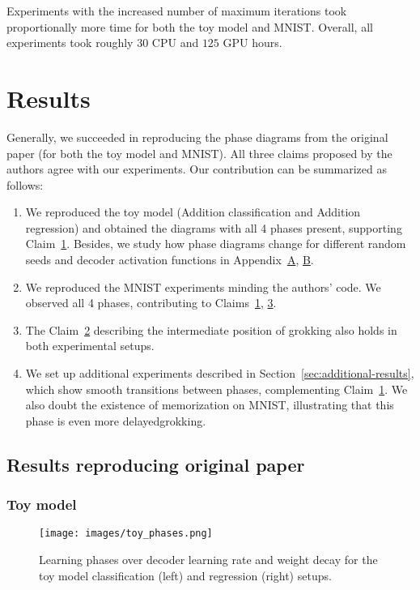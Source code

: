 Experiments with the increased number of maximum iterations took proportionally more time for both the toy model and MNIST. Overall, all experiments took roughly $30$ CPU and $125$ GPU hours.

\section{Results}
\label{sec:results}

Generally, we succeeded in reproducing the phase diagrams from the original paper (for both the toy model and MNIST). All three claims proposed by the authors agree with our experiments. Our contribution can be summarized as follows:
\begin{enumerate}
    \item We reproduced the toy model (Addition classification and Addition regression) and obtained the diagrams with all 4 phases present, supporting Claim~\hyperref[claim:1]{1}. Besides, we study how phase diagrams change for different random seeds and decoder activation functions in Appendix~\hyperref[app:A]{A}, \hyperref[app:B]{B}.
    \item We reproduced the MNIST experiments minding the authors' code. We observed all 4 phases, contributing to Claims~\hyperref[claim:1]{1}, \hyperref[claim:3]{3}.
    \item The Claim~\hyperref[claim:2]{2} describing the intermediate position of grokking also holds in both experimental setups.
    \item We set up additional experiments described in Section~\ref{sec:additional-results}, which show smooth transitions between phases, complementing Claim~\hyperref[claim:1]{1}. We also doubt the existence of memorization on MNIST, illustrating that this phase is even more delayed\break grokking.
\end{enumerate}

\subsection{Results reproducing original paper}

\subsubsection{Toy model}

\begin{figure}[h]
\caption{Learning phases over decoder learning rate and weight decay for the toy model classification (left) and regression (right) setups.}
\centering
\texttt{[image: images/toy\_phases.png]}
\label{fig:toy-phases}
\end{figure}

